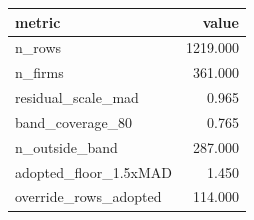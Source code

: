 \begin{tabular}{lr}
\toprule
metric & value \\
\midrule
n_rows & 1219.000 \\
n_firms & 361.000 \\
residual_scale_mad & 0.965 \\
band_coverage_80 & 0.765 \\
n_outside_band & 287.000 \\
adopted_floor_1.5xMAD & 1.450 \\
override_rows_adopted & 114.000 \\
\bottomrule
\end{tabular}
